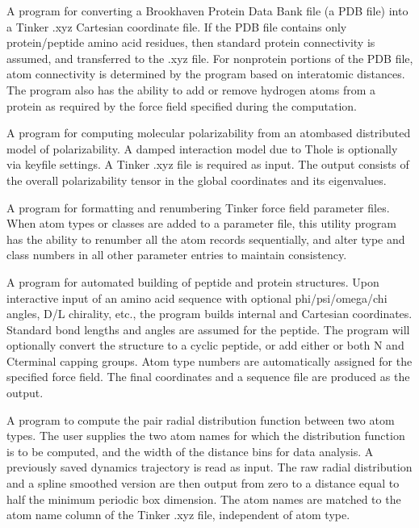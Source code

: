 \documentclass[letterpaper,11pt,english]{sphinxmanual}
\begin{document}

A program for converting a Brookhaven Protein Data Bank file (a PDB file) into a Tinker .xyz Cartesian coordinate file. If the PDB file contains only protein/peptide amino acid residues, then standard protein connectivity is assumed, and transferred to the .xyz file. For non\sphinxhyphen{}protein portions of the PDB file, atom connectivity is determined by the program based on interatomic distances. The program also has the ability to add or remove hydrogen atoms from a protein as required by the force field specified during the computation.


A program for computing molecular polarizability from an atom\sphinxhyphen{}based distributed model of polarizability. A damped interaction model due to Thole is optionally via keyfile settings. A Tinker .xyz file is required as input. The output consists of the overall polarizability tensor in the global coordinates and its eigenvalues.


A program for formatting and renumbering Tinker force field parameter files. When atom types or classes are added to a parameter file, this utility program has the ability to renumber all the atom records sequentially, and alter type and class numbers in all other parameter entries to maintain consistency.


A program for automated building of peptide and protein structures. Upon interactive input of an amino acid sequence with optional phi/psi/omega/chi angles, D/L chirality, etc., the program builds internal and Cartesian coordinates. Standard bond lengths and angles are assumed for the peptide. The program will optionally convert the structure to a cyclic peptide, or add either or both N\sphinxhyphen{} and C\sphinxhyphen{}terminal capping groups. Atom type numbers are automatically assigned for the specified force field. The final coordinates and a sequence file are produced as the output.


A program to compute the pair radial distribution function between two atom types. The user supplies the two atom names for which the distribution function is to be computed, and the width of the distance bins for data analysis. A previously saved dynamics trajectory is read as input. The raw radial distribution and a spline smoothed version are then output from zero to a distance equal to half the minimum periodic box dimension. The atom names are matched to the atom name column of the Tinker .xyz file, independent of atom type.
\end{document}
